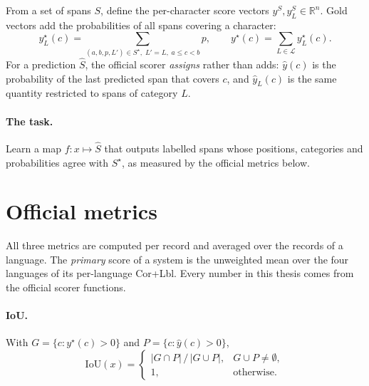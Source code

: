 From a set of spans $S$, define the per-character score vectors $y^{S}, y^{S}_L \in \mathbb{R}^n$. Gold vectors add the probabilities of all spans covering a character:
\begin{equation}
    y^{\star}_L(c) = \sum_{(a,b,p,L') \in S^\star,\; L' = L,\; a \le c < b} p, \qquad
    y^{\star}(c) = \sum_{L \in \mathcal{L}} y^{\star}_L(c).
    \label{eq:gold-vector}
\end{equation}
For a prediction $\hat S$, the official scorer \emph{assigns} rather than adds: $\hat y(c)$ is the probability of the last predicted span that covers $c$, and $\hat y_L(c)$ is the same quantity restricted to spans of category $L$.

\paragraph{The task.} Learn a map $f : x \mapsto \hat S$ that outputs labelled spans whose positions, categories and probabilities agree with $S^\star$, as measured by the official metrics below.

\section{Official metrics}

All three metrics are computed per record and averaged over the records of a language. The \emph{primary} score of a system is the unweighted mean over the four languages of its per-language Cor+Lbl. Every number in this thesis comes from the official scorer functions.

\paragraph{IoU.} With $G = \{c : y^\star(c) > 0\}$ and $P = \{c : \hat y(c) > 0\}$,
\begin{equation}
    \mathrm{IoU}(x) = \begin{cases} |G \cap P| \,/\, |G \cup P|, & G \cup P \neq \emptyset, \\ 1, & \text{otherwise.} \end{cases}
\end{equation}

